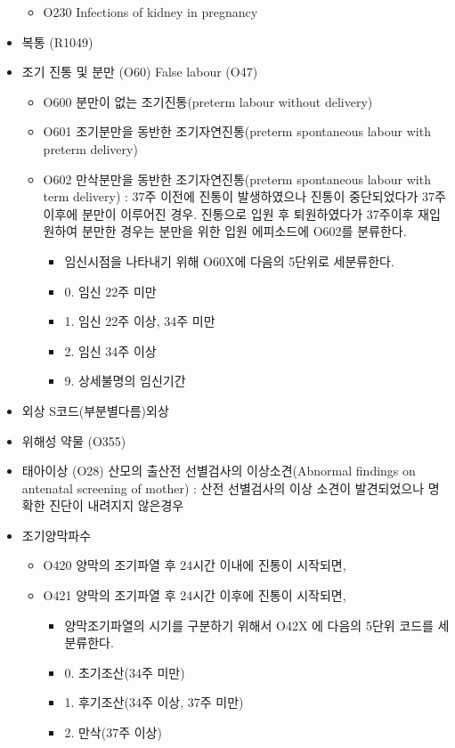\begin{itemize}
\begin{itemize}[-]
	\item O230 Infections of kidney in pregnancy
	\end{itemize}
\item 복통 (R1049)
\item 조기 진통 및 분만 (O60) False labour (O47)
	\begin{itemize}[-]\tightlist
	\item O600 분만이 없는 조기진통(preterm labour without delivery)
	\item O601 조기분만을 동반한 조기자연진통(preterm spontaneous labour with preterm delivery)
	\item O602 만삭분만을 동반한 조기자연진통(preterm spontaneous labour with term delivery) : 37주 이전에 진통이 발생하였으나 진통이 중단되었다가 37주 이후에 분만이 이루어진 경우. 진통으로 입원 후 퇴원하였다가 37주이후 재입원하여 분만한 경우는 분만을 위한 입원 에피소드에 O602를 분류한다.
		\begin{itemize}[-]\tightlist
		\item 임신시점을 나타내기 위해 O60X에 다음의 5단위로 세분류한다.
		\item 0. 임신 22주 미만
		\item 1. 임신 22주 이상, 34주 미만
		\item 2. 임신 34주 이상
		\item 9. 상세불명의 임신기간
		\end{itemize}
	\end{itemize}	
\item 외상 S코드(부분별다름)외상
\item 위해성 약물 (O355)	
\item 태아이상 (O28) 산모의 출산전 선별검사의 이상소견(Abnormal findings on antenatal screening of mother) : 산전 선별검사의 이상 소견이 발견되었으나 명확한 진단이 내려지지 않은경우		
\item 조기양막파수
	\begin{itemize}[-]\tightlist
	\item O420 양막의 조기파열 후 24시간 이내에 진통이 시작되면, 
	\item O421 양막의 조기파열 후 24시간 이후에 진통이 시작되면,
		\begin{itemize}[-]\tightlist
		\item 양막조기파열의 시기를 구분하기 위해서 O42X 에 다음의 5단위 코드를 세분류한다.
		\item 0. 초기조산(34주 미만)
		\item 1. 후기조산(34주 이상, 37주 미만)
		\item 2. 만삭(37주 이상)

\end{itemize}
\end{itemize}
\end{itemize}

